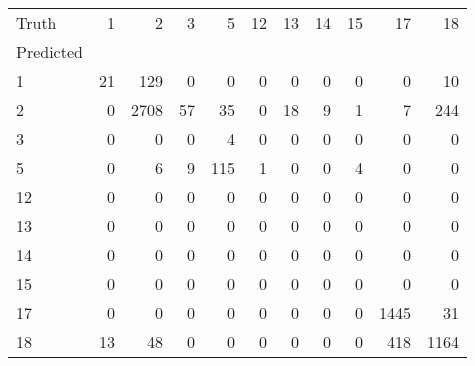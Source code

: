 \begin{tabular}{lrrrrrrrrrr}
\toprule
Truth & 1 & 2 & 3 & 5 & 12 & 13 & 14 & 15 & 17 & 18 \\
Predicted &  &  &  &  &  &  &  &  &  &  \\
\midrule
1 & 21 & 129 & 0 & 0 & 0 & 0 & 0 & 0 & 0 & 10 \\
2 & 0 & 2708 & 57 & 35 & 0 & 18 & 9 & 1 & 7 & 244 \\
3 & 0 & 0 & 0 & 4 & 0 & 0 & 0 & 0 & 0 & 0 \\
5 & 0 & 6 & 9 & 115 & 1 & 0 & 0 & 4 & 0 & 0 \\
12 & 0 & 0 & 0 & 0 & 0 & 0 & 0 & 0 & 0 & 0 \\
13 & 0 & 0 & 0 & 0 & 0 & 0 & 0 & 0 & 0 & 0 \\
14 & 0 & 0 & 0 & 0 & 0 & 0 & 0 & 0 & 0 & 0 \\
15 & 0 & 0 & 0 & 0 & 0 & 0 & 0 & 0 & 0 & 0 \\
17 & 0 & 0 & 0 & 0 & 0 & 0 & 0 & 0 & 1445 & 31 \\
18 & 13 & 48 & 0 & 0 & 0 & 0 & 0 & 0 & 418 & 1164 \\
\bottomrule
\end{tabular}
